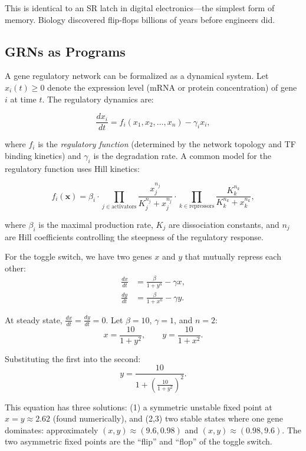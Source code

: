 This is identical to an SR latch in digital electronics---the simplest form of memory. Biology discovered flip-flops billions of years before engineers did.

\subsection{GRNs as Programs}

A gene regulatory network can be formalized as a dynamical system. Let $x_i(t) \geq 0$ denote the expression level (mRNA or protein concentration) of gene $i$ at time $t$. The regulatory dynamics are:

\begin{equation}
\frac{dx_i}{dt} = f_i(x_1, x_2, \ldots, x_n) - \gamma_i x_i,
\label{eq:grn-dynamics}
\end{equation}

where $f_i$ is the \emph{regulatory function} (determined by the network topology and TF binding kinetics) and $\gamma_i$ is the degradation rate. A common model for the regulatory function uses Hill kinetics:

\begin{equation}
f_i(\mathbf{x}) = \beta_i \cdot \prod_{j \in \text{activators}} \frac{x_j^{n_j}}{K_j^{n_j} + x_j^{n_j}} \cdot \prod_{k \in \text{repressors}} \frac{K_k^{n_k}}{K_k^{n_k} + x_k^{n_k}},
\label{eq:hill-regulation}
\end{equation}

where $\beta_i$ is the maximal production rate, $K_j$ are dissociation constants, and $n_j$ are Hill coefficients controlling the steepness of the regulatory response.

\begin{example}
For the toggle switch, we have two genes $x$ and $y$ that mutually repress each other:
\begin{align*}
\frac{dx}{dt} &= \frac{\beta}{1 + y^n} - \gamma x, \\[4pt]
\frac{dy}{dt} &= \frac{\beta}{1 + x^n} - \gamma y.
\end{align*}

At steady state, $\frac{dx}{dt} = \frac{dy}{dt} = 0$. Let $\beta = 10$, $\gamma = 1$, and $n = 2$:
\[
x = \frac{10}{1 + y^2}, \qquad y = \frac{10}{1 + x^2}.
\]

Substituting the first into the second:
\[
y = \frac{10}{1 + \left(\frac{10}{1 + y^2}\right)^2}.
\]

This equation has three solutions: (1) a symmetric unstable fixed point at $x = y \approx 2.62$ (found numerically), and (2,3) two stable states where one gene dominates: approximately $(x, y) \approx (9.6, 0.98)$ and $(x, y) \approx (0.98, 9.6)$. The two asymmetric fixed points are the ``flip'' and ``flop'' of the toggle switch.
\end{example}

